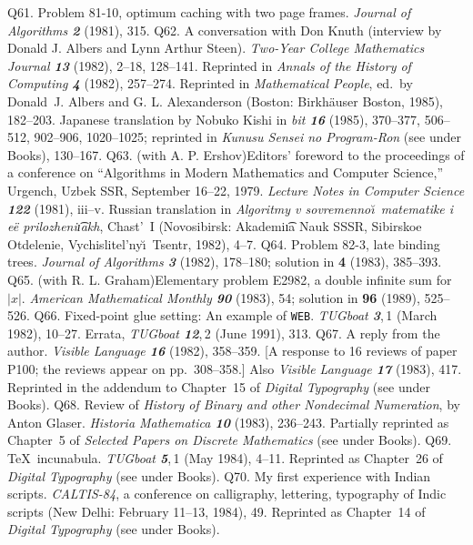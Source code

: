 \p Q61. Problem 81-10, optimum caching with two page frames.
 {\sl Journal of Algorithms\/ \bf 2} (1981), 315.
\p *Q62. A conversation with Don Knuth (interview by Donald J. Albers and Lynn
 Arthur Steen). {\sl Two-Year College Mathematics Journal\/ \bf 13}
 (1982), 2--18, 128--141.
 Reprinted in {\sl Annals of the History of Computing\/ \bf 4} (1982),
 257--274. Reprinted in {\sl Mathematical People}, ed.~by Donald~J. Albers
 and G. L. Alexanderson (Boston: Birkh\"auser Boston, 1985), 182--203.
 Japanese translation by Nobuko Kishi in {\sl bit\/ \bf16} (1985), 370--377,
 506--512, 902--906, 1020--1025;  reprinted in {\sl Kunusu Sensei
 no Program-Ron\/} (see under Books), 130--167.
\p Q63. (with A. P. Ershov)\xskip Editors' foreword to the proceedings of a
 conference on ``Algorithms in Modern Mathematics and Computer Science,''
 Urgench, Uzbek SSR, September 16--22, 1979. {\sl Lecture Notes in Computer
 Science\/ \bf 122} (1981), iii--v.
 Russian translation in {\sl Algoritmy v sovremenno\u\i\ matematike i e\"e
 prilozheni\t{\i}akh}, Chast'~I (Novosibirsk: Akademi\t{\i}a Nauk SSSR,
 Sibirskoe Otdelenie, Vychislitel'ny\u\i\ Tsentr, 1982), 4--7.
\p Q64. Problem 82-3, late binding trees.
 {\sl Journal of Algorithms\/ \bf 3} (1982), 178--180;
 solution in {\bf 4} (1983), 385--393.
\p Q65. (with R. L. Graham)\xskip Elementary problem E2982, a double infinite
 sum for $\vert x\vert$. {\sl American Mathematical Monthly\/ \bf 90} (1983),
 54; solution in {\bf 96} (1989), 525--526.
\p Q66. Fixed-point glue setting: An example of {\tt WEB}. {\sl TUGboat\/
 \bf 3},\,1 (March 1982), 10--27. Errata, {\sl TUGboat\/ \bf12},\,2
 (June 1991), 313.
\p Q67. A reply from the author. {\sl Visible Language\/ \bf 16} (1982),
 358--359.
 [A response to 16 reviews of paper P100; the reviews appear on pp.\ 308--358.]
 Also {\sl Visible Language\/ \bf 17} (1983), 417. Reprinted in the
 addendum to Chapter~15 of {\sl Digital Typography\/} (see under Books).
\p Q68.  Review of {\sl History of Binary and other Nondecimal Numeration},
 by Anton Glaser. {\sl Historia Mathematica\/ \bf 10} (1983), 236--243.  
 Partially reprinted as Chapter~5 of {\sl Selected Papers on
 Discrete Mathematics\/} (see under Books).
\p Q69. \TeX\ incunabula. {\sl TUGboat\/ \bf 5},\,1 (May 1984), 4--11.
 Reprinted as Chapter~26 of {\sl Digital Typography\/} (see under Books).
\p Q70. My first experience with Indian scripts. {\sl CALTIS-84}, a
 conference on calligraphy, lettering, typography of Indic scripts
 (New Delhi: February 11--13, 1984), 49.
 Reprinted as Chapter~14 of {\sl Digital Typography\/} (see under Books).
